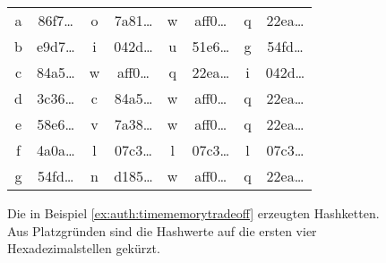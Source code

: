 \begin{beispiel}
\begin{figure}[h]
\begin{center}
	\begin{tabular}{c@{$\;\hasharrow\;$}c@{$\;\VRTF\;$}c@{$\;\hasharrow\;$}c@{$\;\VRTF\;$}c@{$\;\hasharrow\;$}c@{$\;\VRTF\;$}c@{$\;\hasharrow\;$}c}
		a & 86f7\ldots & o & 7a81\ldots & w & aff0\ldots & q & 22ea\ldots\\
		b & e9d7\ldots & i & 042d\ldots & u & 51e6\ldots & g & 54fd\ldots\\
		c & 84a5\ldots & w & aff0\ldots & q & 22ea\ldots & i & 042d\ldots\\
		d & 3c36\ldots & c & 84a5\ldots & w & aff0\ldots & q & 22ea\ldots\\
		e & 58e6\ldots & v & 7a38\ldots & w & aff0\ldots & q & 22ea\ldots\\
		f & 4a0a\ldots & l & 07c3\ldots & l & 07c3\ldots & l & 07c3\ldots\\
		g & 54fd\ldots & n & d185\ldots & w & aff0\ldots & q & 22ea\ldots\\
	\end{tabular}
	\caption{Die in Beispiel \ref{ex:auth:timememorytradeoff} erzeugten Hashketten. Aus Platzgründen sind die Hashwerte auf die ersten vier Hexadezimalstellen gekürzt.}
	\label{fig:auth:timememorytradeoff:hashchains}
\end{center}
\end{figure}


\end{beispiel}
